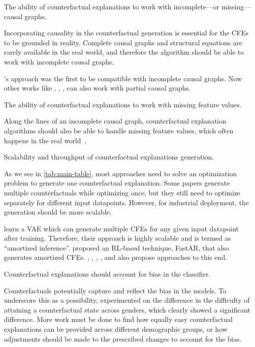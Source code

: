 \begin{challenge}\label{ch:incomplete-causal}
The ability of counterfactual explanations to work with incomplete---or missing---causal graphs. 
\end{challenge}
Incorporating causality in the counterfactual generation is essential for the CFEs to be grounded in reality. 
Complete causal graphs and structural equations are rarely available in the real world, and therefore the algorithm should be able to work with incomplete causal graphs. 

\progress
\citet{mahajan_preserving_2020}'s approach was the first to be compatible with incomplete causal graphs. Now other works like \citet{galhotra-sigmod-cfe}, \citet{verma2021amortized}, \citet{schleich2021geco}, \citet{gan_cfe_amortized} can also work with partial causal graphs. 


\begin{challenge}\label{ch:missing-feature}
The ability of counterfactual explanations to work with missing feature values. 
\end{challenge}
Along the lines of an incomplete causal graph, counterfactual explanation algorithms should also be able to handle missing feature values, which often happens in the real world~\citep{missing-data}. 


\begin{challenge}\label{ch:scale}
Scalability and throughput of counterfactual explanations generation. 
\end{challenge}
As we see in \cref{tab:main-table}, most approaches need to solve an optimization problem to generate one counterfactual explanation. 
Some papers generate multiple counterfactuals while optimizing once, but they still need to optimize separately for different input datapoints. However, for industrial deployment, the generation should be more scalable.  

\progress
\citet{mahajan_preserving_2020} learn a VAE which can generate multiple CFEs for any given input datapoint after training. Therefore, their approach is highly scalable and is termed as ``amortized inference''. 
\citet{verma2021amortized} proposed an RL-based technique, FastAR, that also generates amortized CFEs. \citet{conditional_gan_cfe_looveren}, \citet{rl_cfe_approach2_amortized}, \citep{gan_cfe_amortized}, \citet{hima-beyond-recourse-globalcfe}, and \citet{nemirovsky-hired-people-cfe-countergan} also propose approaches to this end. 


\begin{challenge}\label{ch:bias-in-cfe}
Counterfactual explanations should account for bias in the classifier. 
\end{challenge}
Counterfactuals potentially capture and reflect the bias in the models. 
To underscore this as a possibility, \citet{Ustun19:Actionable} experimented on the difference in the difficulty of attaining a counterfactual state across genders, which clearly showed a significant difference. 
More work must be done to find how equally easy counterfactual explanations can be provided across different demographic groups, or how adjustments should be made to the prescribed changes to account for the bias. 

